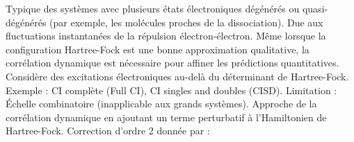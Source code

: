 \markdownRendererUlItem Typique des systèmes avec plusieurs états électroniques dégénérés ou quasi-dégénérés (par exemple, les molécules proches de la dissociation).\markdownRendererUlItemEnd 
\markdownRendererUlEndTight \markdownRendererOlItemEnd 
{}\markdownRendererInterblockSeparator
{}\markdownRendererUlBeginTight
\markdownRendererUlItem Due aux fluctuations instantanées de la répulsion électron-électron.\markdownRendererUlItemEnd 
\markdownRendererUlItem Même lorsque la configuration Hartree-Fock est une bonne approximation qualitative, la corrélation dynamique est nécessaire pour affiner les prédictions quantitatives.\markdownRendererUlItemEnd 
\markdownRendererUlEndTight \markdownRendererOlItemEnd 
\markdownRendererOlEnd \markdownRendererInterblockSeparator
{}\markdownRendererSectionBegin
{}\markdownRendererInterblockSeparator
{}\markdownRendererOlBeginTight
{}\markdownRendererInterblockSeparator
{}\markdownRendererUlBeginTight
\markdownRendererUlItem Considère des excitations électroniques au-delà du déterminant de Hartree-Fock.\markdownRendererUlItemEnd 
\markdownRendererUlItem Exemple : CI complète (Full CI), CI singles and doubles (CISD).\markdownRendererUlItemEnd 
\markdownRendererUlEndTight \markdownRendererOlItemEnd 
\markdownRendererOlEndTight \markdownRendererInterblockSeparator
{}\markdownRendererInterblockSeparator
{}\markdownRendererUlBeginTight
\markdownRendererUlItem Limitation : Échelle combinatoire (inapplicable aux grands systèmes).\markdownRendererUlItemEnd 
\markdownRendererUlEndTight \markdownRendererInterblockSeparator
{}\markdownRendererOlBeginTight
{}\markdownRendererInterblockSeparator
{}\markdownRendererUlBeginTight
\markdownRendererUlItem Approche de la corrélation dynamique en ajoutant un terme perturbatif à l'Hamiltonien de Hartree-Fock.\markdownRendererUlItemEnd 
\markdownRendererUlItem Correction d'ordre 2 donnée par :\markdownRendererUlItemEnd 
\markdownRendererUlEndTight \markdownRendererOlItemEnd 
\markdownRendererOlEndTight \markdownRendererInterblockSeparator
{}\markdownRendererInterblockSeparator
